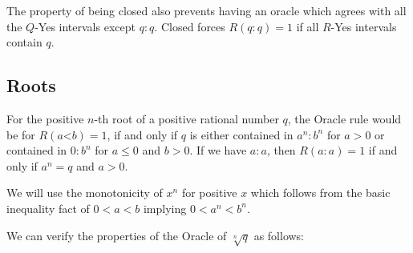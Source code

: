\documentclass[12pt]{article}
\theoremstyle{remark}
\newcommand{\lt}{\mathord{<}}
\begin{document}
The property of being closed also prevents having an oracle which agrees with all the $Q$-Yes intervals except $q:q$. Closed forces $R(q:q)=1$ if all $R$-Yes intervals contain $q$.

\subsection{Roots}\label{sec:roots}

For the positive $n$-th root of a positive rational number $q$, the Oracle rule would be for $R(a\lt b) = 1$, if and only if $q$ is either contained in $a^n:b^n$ for $a>0$ or contained in $0:b^n$ for $a \leq 0$ and $b>0$. If we have $a:a$, then $R(a:a) = 1$ if and only if $a^n = q$ and $a>0$.

We will use the monotonicity of $x^n$ for positive $x$ which follows from the basic inequality fact of $ 0 < a < b$ implying $0 < a^n < b^n$.

We can verify the properties of the Oracle of $\sqrt[n]{q}$ as follows: 
\end{document}
